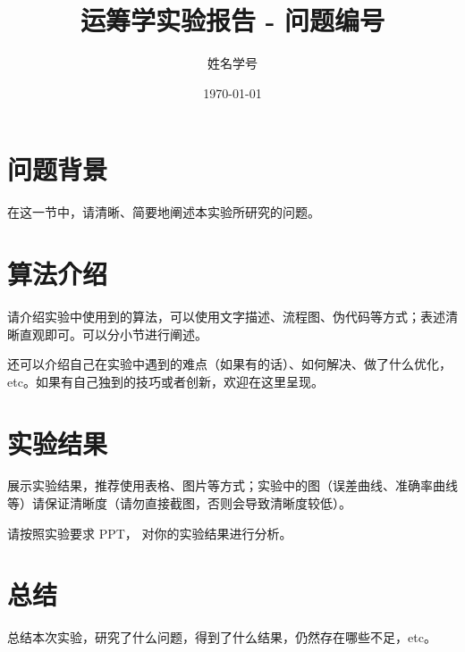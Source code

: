 \documentclass[12pt]{article}
\title{运筹学实验报告 - 问题编号}
\author{姓名\quad 学号}
\date{\today}
\begin{document}
	\maketitle

	\section{问题背景}

	在这一节中，请清晰、简要地阐述本实验所研究的问题。

	\section{算法介绍}

	请介绍实验中使用到的算法，可以使用文字描述、流程图、伪代码等方式；表述清晰直观即可。可以分小节进行阐述。

	还可以介绍自己在实验中遇到的难点（如果有的话）、如何解决、做了什么优化，etc。如果有自己独到的技巧或者创新，欢迎在这里呈现。

	\section{实验结果}

	展示实验结果，推荐使用表格、图片等方式；实验中的图（误差曲线、准确率曲线等）请保证清晰度（请勿直接截图，否则会导致清晰度较低）。
	
	请按照实验要求 PPT， 对你的实验结果进行分析。

	\section{总结}

	总结本次实验，研究了什么问题，得到了什么结果，仍然存在哪些不足，etc。

	
\end{document}
